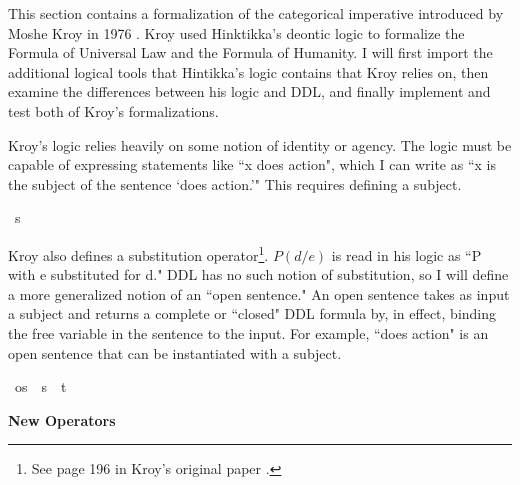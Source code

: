 %
\begin{isabellebody}%
%
%
\isadelimtheory
%
\endisadelimtheory
%
\isatagtheory
%
\endisatagtheory
{\isafoldtheory}%
%
\isadelimtheory
%
\endisadelimtheory
%
\isadelimdocument
%
\endisadelimdocument
%
\isatagdocument
%
\isamarkuptrue%
%
\endisatagdocument
{\isafolddocument}%
%
\isadelimdocument
%
\endisadelimdocument
%
\begin{isamarkuptext}%
This section contains a formalization of the categorical imperative introduced by Moshe Kroy in 
1976 \cite{kroy}. Kroy used Hinktikka's deontic logic to formalize the Formula of Universal Law and
the Formula of Humanity. I will first import the additional logical tools that Hintikka's logic contains 
that Kroy relies on, then examine the differences between his logic and DDL, and finally implement 
and test both of Kroy's formalizations.%
\end{isamarkuptext}\isamarkuptrue%
%
\isadelimdocument
%
\endisadelimdocument
%
\isatagdocument
%
\isamarkuptrue%
%
\endisatagdocument
{\isafolddocument}%
%
\isadelimdocument
%
\endisadelimdocument
%
\begin{isamarkuptext}%
Kroy's logic relies heavily on some notion of identity or agency. The logic must be capable of 
expressing statements like ``x does action", which I can write as ``x is the subject of the sentence
 `does action.'" This requires defining a subject.%
\end{isamarkuptext}\isamarkuptrue%
\isamarkupfalse%
\ s\ %
%
\begin{isamarkuptext}%
Kroy also defines a substitution operator\footnote{See page 196 in Kroy's original paper \cite{kroy}.}. $P (d/e)$ is read in his logic as ``P with e substituted 
for d." DDL has no such notion of substitution, so I will define a more generalized notion of an ``open 
sentence." An open sentence takes as input a subject and returns a complete or ``closed" DDL formula by, 
in effect, binding the free variable in the sentence to the input. For example, 
``does action" is an open sentence that can be instantiated with a subject.%
\end{isamarkuptext}\isamarkuptrue%
\isamarkupfalse%
\ os\ {\isacharequal}\ {\isachardoublequoteopen}{\isacharparenleft}s\ {\isasymRightarrow}\ t{\isacharparenright}{\isachardoublequoteclose}\isanewline
%
\isanewline
%
%
\begin{isamarkuptext}%
\textbf{New Operators}


\end{isamarkuptext}
\end{isabellebody}

